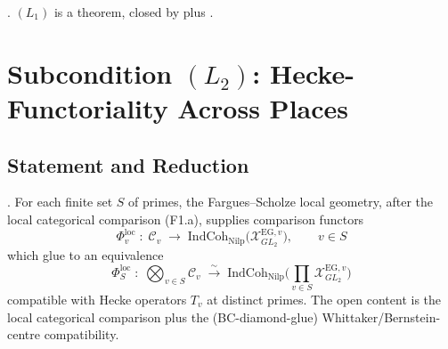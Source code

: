 \begin{corollary}[\((L_{1})\) holds]
\label{v4-arith:acd:cor:L1-holds}
\ClaimStatusProvedHere. \((L_{1})\) is a theorem, closed by
 plus
.
\end{corollary}

\section{Subcondition \((L_{2})\): Hecke-Functoriality Across Places}
\label{v4-arith:acd:L2}

\subsection{Statement and Reduction}

\begin{theorem}[\((L_{2})\) reduction]
\label{v4-arith:acd:thm:L2-reduction}
\ClaimStatusNeedsVerification. For each finite set \(S\) of primes, the
Fargues--Scholze local geometry, after the local categorical comparison
(F1.a), supplies comparison functors
\begin{equation}
\label{v4-arith:acd:eq:local-FS}
\Phi_{v}^{\mathrm{loc}}\;:\;\mathcal{C}_{v}\;\longrightarrow\;\mathrm{IndCoh}_{\mathrm{Nilp}}\bigl(\mathcal{X}^{\mathrm{EG},v}_{GL_{2}}\bigr),\qquad v\in S
\end{equation}
which glue to an equivalence
\begin{equation}
\label{v4-arith:acd:eq:glued-FS}
\Phi_{S}^{\mathrm{loc}}\;:\;\bigotimes_{v\in S}\mathcal{C}_{v}\;\xrightarrow{\sim}\;\mathrm{IndCoh}_{\mathrm{Nilp}}\biggl(\prod_{v\in S}\mathcal{X}^{\mathrm{EG},v}_{GL_{2}}\biggr)
\end{equation}
compatible with Hecke operators \(T_{v}\) at distinct primes. The
open content is the local categorical comparison plus the
(BC-diamond-glue) Whittaker/Bernstein-centre compatibility.
\end{theorem}

